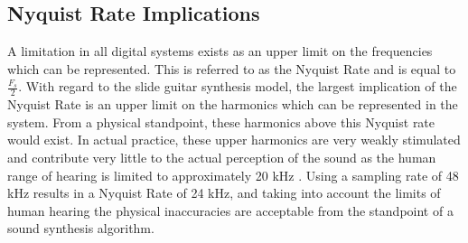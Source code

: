 \documentclass[../main.tex]{subfiles}
\begin{document}
\clearpage

\subsection{Nyquist Rate Implications}
A limitation in all digital systems exists as an upper limit on the frequencies which can be represented. This is referred to as the Nyquist Rate and is equal to $\frac{F_s}{2}$. With regard to the slide guitar synthesis model, the largest implication of the Nyquist Rate is an upper limit on the harmonics which can be represented in the system. From a physical standpoint, these harmonics above this Nyquist rate would exist. In actual practice, these upper harmonics are very weakly stimulated and contribute very little to the actual perception of the sound as the human range of hearing is limited to approximately 20 kHz . Using a sampling rate of 48 kHz results in a Nyquist Rate of 24 kHz, and taking into account the limits of human hearing the physical inaccuracies are acceptable from the standpoint of a sound synthesis algorithm.
\end{document}
